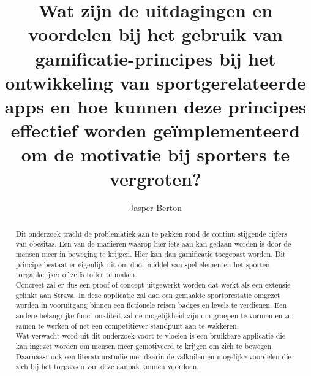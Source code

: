 \documentclass{hogent-article}
\title{Wat zijn de uitdagingen en voordelen bij het gebruik van gamificatie-principes bij het ontwikkeling van sportgerelateerde apps en hoe kunnen deze principes effectief worden geïmplementeerd om de motivatie bij sporters te vergroten?}
\author{Jasper Berton}
\begin{document}
\begin{abstract}
    
   Dit onderzoek tracht de problematiek aan te pakken rond de continu stijgende cijfers van obesitas. Een van de manieren waarop hier iets aan kan gedaan worden is door de mensen meer in beweging te krijgen. Hier kan dan gamificatie toegepast worden. Dit principe bestaat er eigenlijk uit om door middel van spel elementen het sporten toegankelijker of zelfs toffer te maken.
    \\
    
   Concreet zal er dus een proof-of-concept uitgewerkt worden dat werkt als een extensie gelinkt aan Strava. In deze applicatie zal dan een gemaakte sportprestatie omgezet worden in vooruitgang binnen een fictionele reisen badges en levels te verdienen. Een andere belangrijke functionaliteit zal de mogelijkheid zijn om groepen te vormen en zo samen te werken of net een competitiever standpunt aan te wakkeren. \\
   
   Wat verwacht word uit dit onderzoek voort te vloeien is een bruikbare applicatie die kan ingezet worden om mensen meer gemotiveerd te krijgen om zich te bewegen. Daarnaast ook een literatuurstudie met daarin de valkuilen en mogelijke voordelen die zich bij het toepassen van deze aanpak kunnen voordoen. 
 
\end{abstract}

\tableofcontents



\printbibliography[heading=bibintoc]
\end{document}
